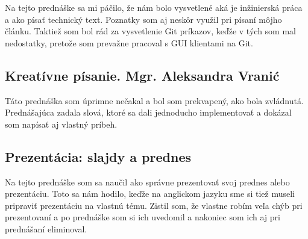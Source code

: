 \documentclass[10pt,oneside,english,a4paper]{article}
\begin{document}
Na tejto prednáške sa mi páčilo, že nám bolo vysvetlené aká je inžinierská práca a ako písať technický text. Poznatky som aj neskôr využil pri písaní môjho článku. Taktiež som bol rád za vysvetlenie Git príkazov, keďže v tých som mal nedostatky, pretože som prevažne pracoval s GUI klientami na Git.

\subsection{Kreatívne písanie. Mgr. Aleksandra Vranić}

Táto prednáška som úprimne nečakal a bol som prekvapený, ako bola zvládnutá. Prednášajúca zadala slová, ktoré sa dali jednoducho implementovať a dokázal som napísať aj vlastný príbeh.

\subsection{Prezentácia: slajdy a prednes}

Na tejto prednáške som sa naučil ako správne prezentovať svoj prednes alebo prezentáciu. Toto sa nám hodilo, keďže na anglickom jazyku sme si tiež museli pripraviť prezentáciu na vlastnú tému. Zistil som, že vlastne robím veľa chýb pri prezentovaní a po prednáške som si ich uvedomil a nakoniec som ich aj pri prednášaní eliminoval.



\end{document}
